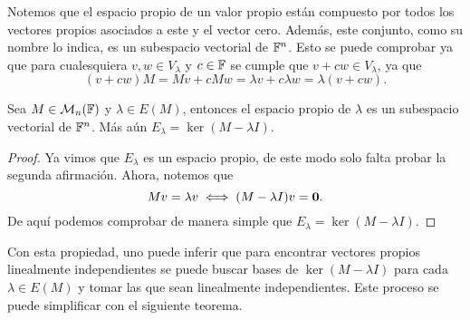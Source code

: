 Notemos que el espacio propio de un valor propio están compuesto por todos los vectores propios asociados a este y el vector cero. Además, este conjunto, como su nombre lo indica, es un subespacio vectorial de $\mathbb{F}^n$. Esto se puede comprobar ya que para cualesquiera $v,w \in V_\lambda$ y $c \in \mathbb{F}$ se cumple que $v+cw \in V_\lambda$, ya que
  \[
    (v+cw)M = Mv + cMw = \lambda v + c \lambda w = \lambda (v+cw).
  \]
\begin{prop} \label{prop:BVPDiag}
  Sea $M \in \mathcal{M}_n(\mathbb{F})$ y $\lambda \in E(M)$, entonces el espacio propio de $\lambda$ es un subespacio vectorial de $\mathbb{F}^n$. Más aún $E_\lambda = \ker(M-\lambda I)$.
\end{prop}
\begin{proof}
  Ya vimos que $E_\lambda$ es un espacio propio, de este modo solo falta probar la segunda afirmación. Ahora, notemos que 
  \[ Mv = \lambda v \iff (M-\lambda I)v = \mathbf{0}. \]
  De aquí podemos comprobar de manera simple que $E_\lambda = \ker(M-\lambda I)$.
\end{proof}

Con esta propiedad, uno puede inferir que para encontrar vectores propios linealmente independientes se puede buscar bases de $\ker(M-\lambda I)$ para cada $\lambda \in E(M)$ y tomar las que sean linealmente independientes. Este proceso se puede simplificar con el siguiente teorema.


